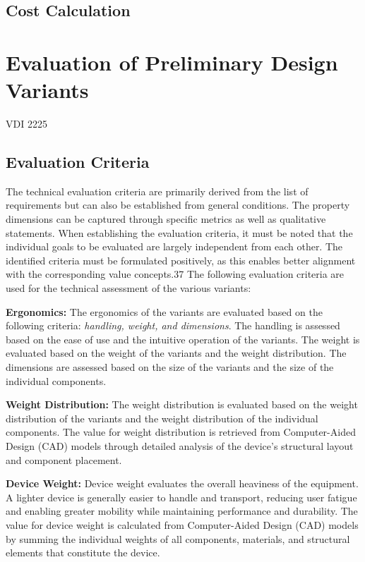\subsection{Cost Calculation}

\section{Evaluation of Preliminary Design Variants}
VDI 2225

\subsection{Evaluation Criteria}

The technical evaluation criteria are primarily derived from the list of requirements but can also be established from general conditions. The property dimensions can be captured through specific metrics as well as qualitative statements. When establishing the evaluation criteria, it must be noted that the individual goals to be evaluated are largely independent from each other. The identified criteria must be formulated positively, as this enables better alignment with the corresponding value concepts.37 The following evaluation criteria are used for the technical assessment of the various variants:

\textbf{Ergonomics:} The ergonomics of the variants are evaluated based on the following criteria: \textit{handling, weight, and dimensions}. The handling is assessed based on the ease of use and the intuitive operation of the variants. The weight is evaluated based on the weight of the variants and the weight distribution. The dimensions are assessed based on the size of the variants and the size of the individual components.

\textbf{Weight Distribution:} The weight distribution is evaluated based on the weight distribution of the variants and the weight distribution of the individual components. The value for weight distribution is retrieved from Computer-Aided Design (CAD) models through detailed analysis of the device's structural layout and component placement.

\textbf{Device Weight:} Device weight evaluates the overall heaviness of the equipment. A lighter device is generally easier to handle and transport, reducing user fatigue and enabling greater mobility while maintaining performance and durability. The value for device weight is calculated from Computer-Aided Design (CAD) models by summing the individual weights of all components, materials, and structural elements that constitute the device.

